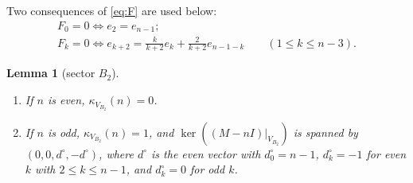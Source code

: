 \documentclass[11pt]{amsart}
\theoremstyle{plain}
\newtheorem{lemma}{Lemma}
\theoremstyle{definition}
\theoremstyle{remark}
\numberwithin{equation}{section}
\newcommand{\dc}{d^{\circ}}
\newcommand{\VBb}{V_{B_2}}
\begin{document}
Two consequences of \eqref{eq:F} are used below:
\begin{gather}
F_0=0\iff e_2=e_{n-1};\label{eq:F0}\\
F_k=0\iff e_{k+2}=\frac{k}{k+2}e_k+\frac{2}{k+2}e_{n-1-k}\qquad(1\le k\le n-3).
\label{eq:Fk}
\end{gather}

\begin{lemma}[sector \(B_2\)]\label{lem:B2}
\begin{enumerate}
\item[(a)] If \(n\) is even, \(\kappa_{\VBb}(n)=0\).
\item[(b)] If \(n\) is odd, \(\kappa_{\VBb}(n)=1\), and \(\ker((M-nI)|_{\VBb})\) is
spanned by \((0,0,\dc,-\dc)\), where \(\dc\) is the even vector with \(\dc_0=n-1\),
\(\dc_k=-1\) for even \(k\) with \(2\le k\le n-1\), and \(\dc_k=0\) for odd \(k\).
\end{enumerate}
\end{lemma}
\end{document}
